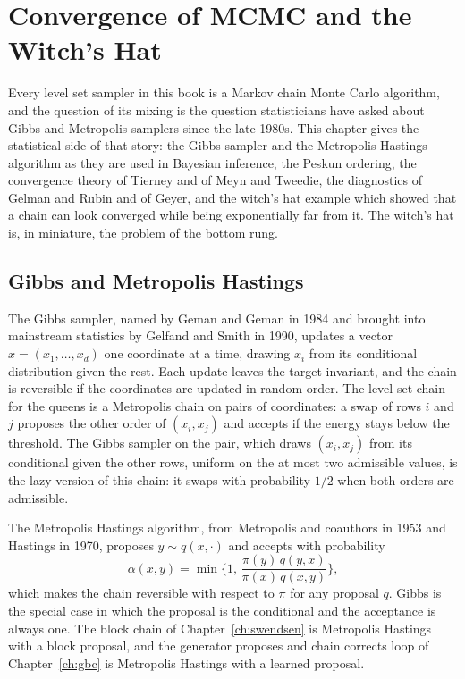 \chapter{Convergence of MCMC and the Witch's Hat}
\label{ch:witchhat}

Every level set sampler in this book is a Markov chain Monte Carlo algorithm, and the question of its mixing is the question statisticians have asked about Gibbs and Metropolis samplers since the late 1980s. This chapter gives the statistical side of that story: the Gibbs sampler and the Metropolis Hastings algorithm as they are used in Bayesian inference, the Peskun ordering, the convergence theory of Tierney and of Meyn and Tweedie, the diagnostics of Gelman and Rubin and of Geyer, and the witch's hat example which showed that a chain can look converged while being exponentially far from it. The witch's hat is, in miniature, the problem of the bottom rung.

\section{Gibbs and Metropolis Hastings}

The Gibbs sampler, named by Geman and Geman in 1984 and brought into mainstream statistics by Gelfand and Smith in 1990, updates a vector $x = (x_1, \dots, x_d)$ one coordinate at a time, drawing $x_i$ from its conditional distribution given the rest. Each update leaves the target invariant, and the chain is reversible if the coordinates are updated in random order. The level set chain for the queens is a Metropolis chain on pairs of coordinates: a swap of rows $i$ and $j$ proposes the other order of $(x_i, x_j)$ and accepts if the energy stays below the threshold. The Gibbs sampler on the pair, which draws $(x_i, x_j)$ from its conditional given the other rows, uniform on the at most two admissible values, is the lazy version of this chain: it swaps with probability $1/2$ when both orders are admissible.

The Metropolis Hastings algorithm, from Metropolis and coauthors in 1953 and Hastings in 1970, proposes $y \sim q(x, \cdot)$ and accepts with probability
\[
\alpha(x, y) = \min\Big\{ 1, \, \frac{\pi(y) \, q(y, x)}{\pi(x) \, q(x, y)} \Big\} ,
\]
which makes the chain reversible with respect to $\pi$ for any proposal $q$. Gibbs is the special case in which the proposal is the conditional and the acceptance is always one. The block chain of Chapter~\ref{ch:swendsen} is Metropolis Hastings with a block proposal, and the generator proposes and chain corrects loop of Chapter~\ref{ch:gbc} is Metropolis Hastings with a learned proposal.

